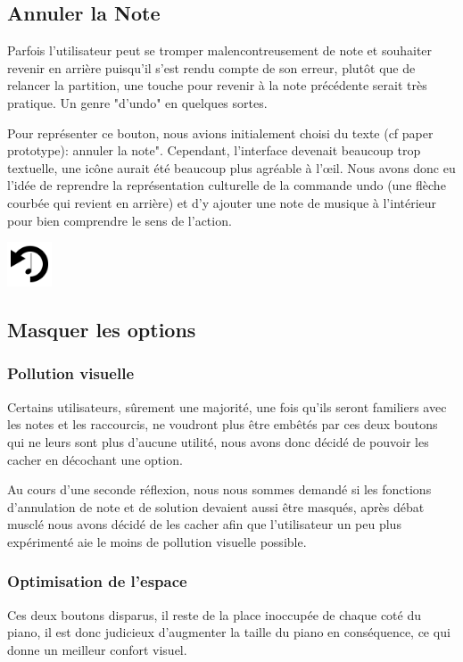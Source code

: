 \documentclass{article}
\begin{document}
\subsection{Annuler la Note}
Parfois l'utilisateur peut se tromper malencontreusement de note et souhaiter revenir en arrière puisqu'il s'est rendu compte de son erreur,
plutôt que de relancer la partition, une touche pour revenir à la note précédente serait très pratique. Un genre "d'undo" en quelques sortes.


Pour représenter ce bouton, nous avions initialement choisi du texte (cf paper prototype): annuler la note". Cependant, l'interface devenait beaucoup
trop textuelle, une icône aurait été beaucoup plus agréable à l’œil. Nous avons donc eu l'idée de reprendre la représentation culturelle de la commande
undo (une flèche courbée qui revient en arrière) et d'y ajouter une note de musique à l'intérieur pour bien comprendre le sens de l'action.

\begin{center}
\includegraphics[width = 50px]{./images/undo.png}
\end{center}
\subsection{Masquer les options}
\subsubsection{Pollution visuelle}
Certains utilisateurs, sûrement une majorité, une fois qu'ils seront familiers avec les notes et les raccourcis, ne voudront plus 
être embêtés par ces deux boutons qui ne leurs sont plus d'aucune utilité, nous avons donc décidé de pouvoir les cacher en décochant
une option.


Au cours d'une seconde réflexion, nous nous sommes demandé si les fonctions d'annulation de note et de solution devaient aussi 
être masqués, après débat musclé nous avons décidé de les cacher afin que l'utilisateur un peu plus expérimenté aie le moins de 
pollution  visuelle possible.
\subsubsection{Optimisation de l'espace}
Ces deux boutons disparus, il reste de la place inoccupée de chaque coté du piano, il est donc judicieux d'augmenter la taille 
du piano en conséquence, ce qui donne un meilleur confort visuel.
\end{document}
